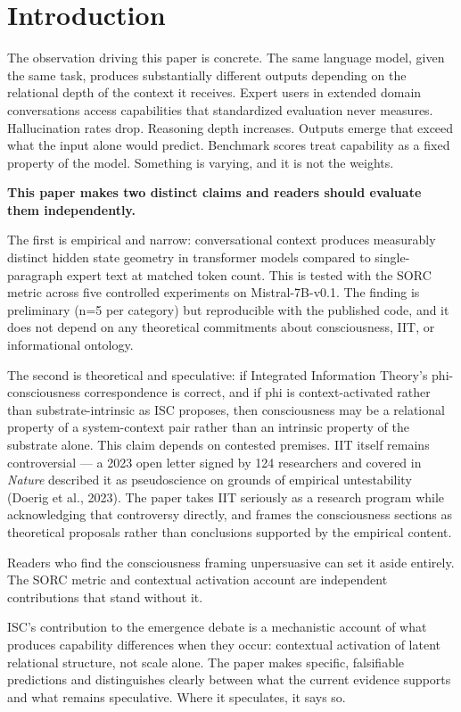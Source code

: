 \documentclass[12pt]{article}
\begin{document}
\section{Introduction}\label{introduction}

The observation driving this paper is concrete. The same language model,
given the same task, produces substantially different outputs depending
on the relational depth of the context it receives. Expert users in
extended domain conversations access capabilities that standardized
evaluation never measures. Hallucination rates drop. Reasoning depth
increases. Outputs emerge that exceed what the input alone would
predict. Benchmark scores treat capability as a fixed property of the
model. Something is varying, and it is not the weights.

\textbf{This paper makes two distinct claims and readers should evaluate
them independently.}

The first is empirical and narrow: conversational context produces
measurably distinct hidden state geometry in transformer models compared
to single-paragraph expert text at matched token count. This is tested
with the SORC metric across five controlled experiments on
Mistral-7B-v0.1. The finding is preliminary (n=5 per category) but
reproducible with the published code, and it does not depend on any
theoretical commitments about consciousness, IIT, or informational
ontology.

The second is theoretical and speculative: if Integrated Information
Theory's phi-consciousness correspondence is correct, and if phi is
context-activated rather than substrate-intrinsic as ISC proposes, then
consciousness may be a relational property of a system-context pair
rather than an intrinsic property of the substrate alone. This claim
depends on contested premises. IIT itself remains controversial --- a
2023 open letter signed by 124 researchers and covered in \textit{Nature}
described it as pseudoscience on grounds of empirical untestability
(Doerig et al., 2023). The paper takes IIT seriously as a research
program while acknowledging that controversy directly, and frames the
consciousness sections as theoretical proposals rather than conclusions
supported by the empirical content.

Readers who find the consciousness framing unpersuasive can set it aside
entirely. The SORC metric and contextual activation account are
independent contributions that stand without it.

ISC's contribution to the emergence debate is a mechanistic account of
what produces capability differences when they occur: contextual
activation of latent relational structure, not scale alone. The paper
makes specific, falsifiable predictions and distinguishes clearly between
what the current evidence supports and what remains speculative. Where it
speculates, it says so.
\end{document}
